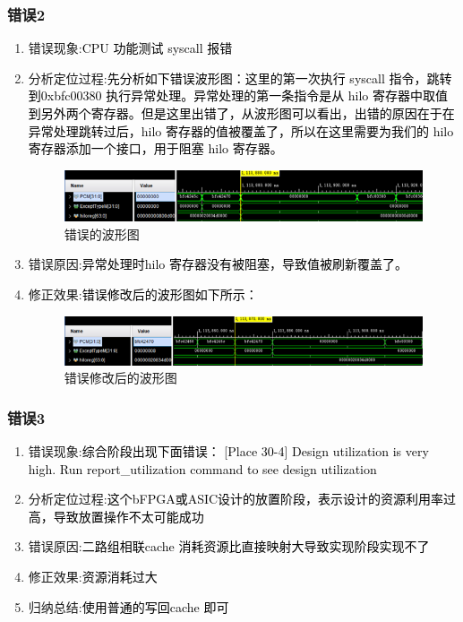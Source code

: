 \subsubsection{错误2}
\begin{enumerate}[(1)]
    \item 错误现象:\textcolor{black}{CPU 功能测试 syscall 报错}
    \item 分析定位过程:\textcolor{black}{先分析如下错误波形图：这里的第一次执行 syscall 指令，跳转到0xbfc00380 执行异常处理。异常处理的第一条指令是从 hilo 寄存器中取值到另外两个寄存器。但是这里出错了，从波形图可以看出，出错的原因在于在异常处理跳转过后，hilo 寄存器的值被覆盖了，所以在这里需要为我们的 hilo 寄存器添加一个接口，用于阻塞 hilo 寄存器。
}
     \begin{figure}[htbp]
        \centering
        \includegraphics[width=\textwidth]{image/wave1.png}
        \caption{错误的波形图}
    \end{figure}
    
    \item 错误原因:\textcolor{black}{异常处理时hilo 寄存器没有被阻塞，导致值被刷新覆盖了。}
    \item 修正效果:\textcolor{black}{错误修改后的波形图如下所示：}
    \begin{figure}[htbp]
        \centering
        \includegraphics[width=\textwidth]{image/wave2.png}
        \caption{错误修改后的波形图}
    \end{figure}
\end{enumerate}

\subsubsection{错误3}
\begin{enumerate}[(1)]
    \item 错误现象:\textcolor{black}{综合阶段出现下面错误：
    [Place 30-4] Design utilization is very high. Run report\_utilization command to see design utilization}
    
    \item 分析定位过程:\textcolor{black}{这个bFPGA或ASIC设计的放置阶段，表示设计的资源利用率过高，导致放置操作不太可能成功}
    \item 错误原因:\textcolor{black}{二路组相联cache 消耗资源比直接映射大导致实现阶段实现不了}
    \item 修正效果:\textcolor{black}{资源消耗过大}
    \item 归纳总结:\textcolor{black}{使用普通的写回cache 即可}
\end{enumerate}

